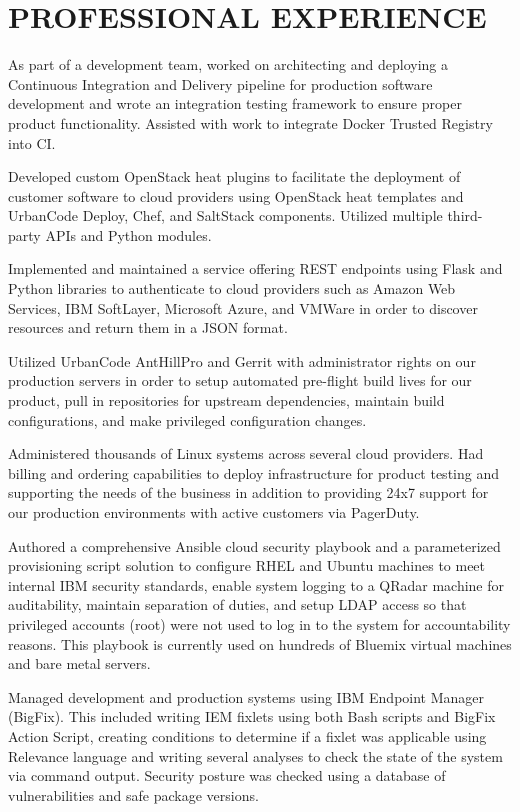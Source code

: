 \documentclass[]{dylan-resume}
\begin{document}
\begin{minipage}[t]{1.00\textwidth}
\section{PROFESSIONAL EXPERIENCE}
\begin{tightemize}
\vspace{\topsep} %
\item {As part of a development team, worked on architecting and deploying a
Continuous Integration and Delivery pipeline for production software
development and wrote an integration testing framework to ensure proper
product functionality. Assisted with work to integrate Docker Trusted
Registry into CI.}
\item {Developed custom OpenStack heat plugins to facilitate the deployment of
customer software to cloud providers using OpenStack heat templates and
UrbanCode Deploy, Chef, and SaltStack components. Utilized multiple
third-party APIs and Python modules.}
\item {Implemented and maintained a service offering REST endpoints using
Flask and Python libraries to authenticate to cloud providers such as
Amazon Web Services, IBM SoftLayer, Microsoft Azure, and VMWare in order
to discover resources and return them in a JSON format.}
\item {Utilized UrbanCode AntHillPro and Gerrit with administrator rights on our
production servers in order to setup automated pre-flight build lives for our
product, pull in repositories for upstream dependencies, maintain build
configurations, and make privileged configuration changes.}
\item {Administered thousands of Linux systems across several cloud providers.
Had billing and ordering capabilities to deploy infrastructure for
product testing and supporting the needs of the business in addition to
providing 24x7 support for our production environments with active
customers via PagerDuty.}
\item {Authored a comprehensive Ansible cloud security playbook and a
parameterized provisioning script solution to configure RHEL and Ubuntu
machines to meet internal IBM security standards, enable system logging
to a QRadar machine for auditability, maintain separation of duties, and
setup LDAP access so that privileged accounts (root) were not used to
log in to the system for accountability reasons. This playbook is
currently used on hundreds of Bluemix virtual machines and bare metal
servers.}
\item {Managed development and production systems using IBM Endpoint Manager
(BigFix). This included writing IEM fixlets using both Bash scripts and
BigFix Action Script, creating conditions to determine if a fixlet was
applicable using Relevance language and writing several analyses to
check the state of the system via command output. Security posture was
checked using a database of vulnerabilities and safe package versions.}
\end{tightemize}


\end{minipage}
\end{document}
